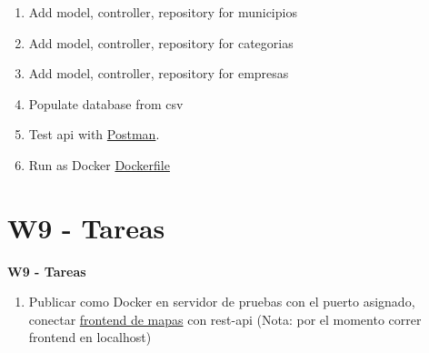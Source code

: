\documentclass{beamer}
\begin{document}
\begin{frame}
\begin{enumerate}
\item
    Add  model, controller, repository for municipios
\item
    Add  model, controller, repository for categorias
\item
    Add  model, controller, repository for empresas
\item
    Populate database from csv
\item
    Test api with \href{https://www.postman.com/downloads/}{Postman}.	
\item
	Run as Docker \href{https://github.com/adsoftsito/ng5-api/blob/master/Dockerfile}{Dockerfile}
	 
\end{enumerate}

	


\end{frame}


\section{W9  - Tareas }

\begin{frame}


\textbf{W9  - Tareas}


\begin{enumerate}
\item
	Publicar como Docker en servidor de pruebas con el puerto asignado, conectar \href{https://github.com/adsoftsito/bigdata-maps}{frontend de mapas} con rest-api (Nota: por el momento correr frontend en localhost)
	
\end{enumerate} 


\end{frame}
\end{document}
